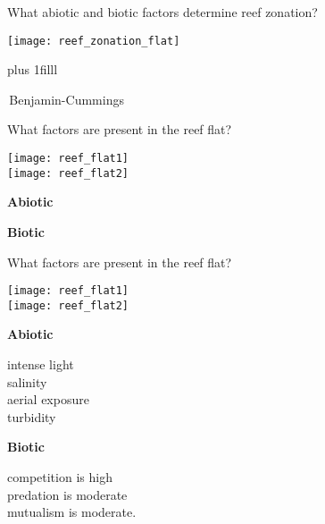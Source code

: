 \documentclass[t]{beamer}
\begin{document}

\begin{frame}[t]{What abiotic and biotic factors determine reef zonation?}

\texttt{[image: reef\_zonation\_flat]}

\vskip0pt plus 1filll

\tiny\textcopyright\,Benjamin-Cummings
\end{frame}

\begin{frame}[t]{What factors are present in the reef flat?}

\begin{multicols}{2}
	\begin{center}
	
	\texttt{[image: reef\_flat1]}\\[1ex]
	
	\texttt{[image: reef\_flat2]}
	\end{center}
\columnbreak

	\hangpara\textbf{Abiotic}
	
	\vspace*{4\baselineskip}
	
	\hangpara\textbf{Biotic}
	
	
\end{multicols}
\end{frame}

\begin{frame}[t]{What factors are present in the reef flat?}

\begin{multicols}{2}
	\begin{center}
	
	\texttt{[image: reef\_flat1]}\\[1ex]
	
	\texttt{[image: reef\_flat2]}
	\end{center}
\columnbreak

	\hangpara\textbf{Abiotic}
	
	\hangpara intense light\\\pause salinity\\\pause aerial exposure\\\pause turbidity

	\hangpara\textbf{Biotic}
	
	\hangpara competition is high\\\pause predation is moderate\\\pause mutualism is moderate.

	
\end{multicols}
\end{frame}
\end{document}
